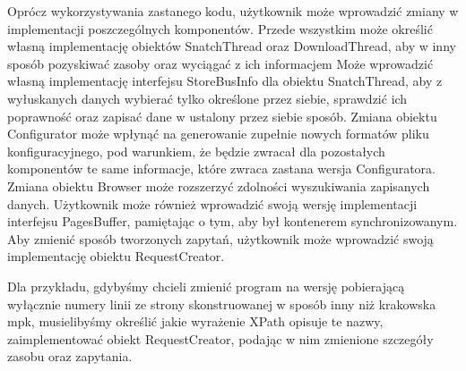 \documentclass[11pt]{article}
\begin{document}
Oprócz wykorzystywania zastanego kodu, użytkownik może wprowadzić zmiany w implementacji poszczególnych komponentów. Przede wszystkim może określić własną implementację obiektów SnatchThread oraz DownloadThread, aby w inny sposób pozyskiwać zasoby oraz wyciągać z ich informacjem Może wprowadzić własną implementację interfejsu StoreBusInfo dla obiektu SnatchThread, aby z wyłuskanych danych wybierać tylko określone przez siebie, sprawdzić ich poprawność oraz zapisać dane w ustalony przez siebie sposób. Zmiana obiektu Configurator może wpłynąć na generowanie zupełnie nowych formatów pliku konfiguracyjnego, pod warunkiem, że będzie zwracał dla pozostałych komponentów te same informacje, które zwraca zastana wersja Configuratora. Zmiana obiektu Browser może rozszerzyć zdolności wyszukiwania zapisanych danych. Użytkownik może również wprowadzić swoją wersję implementacji interfejsu PagesBuffer, pamiętając o tym, aby był kontenerem synchronizowanym. Aby zmienić sposób tworzonych zapytań, użytkownik może wprowadzić swoją implementację obiektu RequestCreator.

Dla przykładu, gdybyśmy chcieli zmienić program na wersję pobierającą wyłącznie numery linii ze strony skonstruowanej w sposób inny niż krakowska mpk, musielibyśmy określić jakie wyrażenie XPath opisuje te nazwy, zaimplementować obiekt RequestCreator, podając w nim zmienione szczegóły zasobu oraz zapytania.
\end{document}
